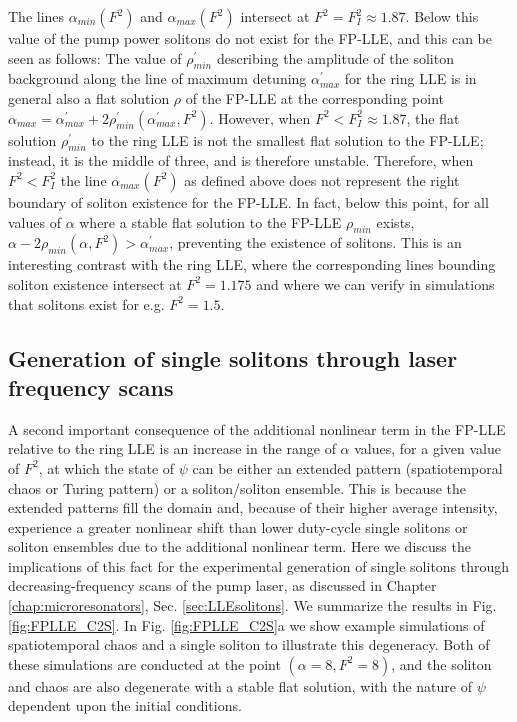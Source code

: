 The lines $\alpha_{min} (F^2)$ and $\alpha_{max} (F^2)$ intersect at $F^2=F_I^2\approx1.87$. Below this value of the pump power solitons do not exist for the FP-LLE, and this can be seen as follows: The value of $\rho_{min}^\prime$ describing the amplitude of the soliton background along the line of maximum detuning $\alpha_{max}^\prime$ for the ring LLE is in general also a flat solution $\rho$ of the FP-LLE at the corresponding point $\alpha_{max}=\alpha_{max}^\prime+2\rho_{min}^\prime (\alpha_{max}^\prime,F^2)$. However, when $F^2<F_I^2\approx1.87$, the flat solution $\rho_{min}^\prime$ to the ring LLE is not the smallest flat solution to the FP-LLE; instead, it is the middle of three, and is therefore unstable. Therefore, when $F^2<F_I^2$ the line $\alpha_{max} (F^2)$ as defined above does not represent the right boundary of soliton existence for the FP-LLE. In fact, below this point, for all values of $\alpha$ where a stable flat solution to the FP-LLE $\rho_{min}$   exists, $\alpha-2\rho_{min} (\alpha,F^2 )>\alpha_{max}^\prime$, preventing the existence of solitons. This is an interesting contrast with the ring LLE, where the corresponding lines bounding soliton existence intersect at $F^2=1.175$ and where we can verify in simulations that solitons exist for e.g. $F^2=1.5$.


\subsection{Generation of single solitons through laser frequency scans}

A second important consequence of the additional nonlinear term in the FP-LLE relative to the ring LLE is an increase in the range of $\alpha$ values, for a given value of $F^2$, at which the state of $\psi$ can be either an extended pattern (spatiotemporal chaos or Turing pattern) or a soliton/soliton ensemble. This is because the extended patterns fill the domain and, because of their higher average intensity, experience a greater nonlinear shift than lower duty-cycle single solitons or soliton ensembles due to the additional nonlinear term. Here we discuss the implications of this fact for the experimental generation of single solitons through decreasing-frequency scans of the pump laser, as discussed in Chapter \ref{chap:microresonators}, Sec. \ref{sec:LLEsolitons}. We summarize the results in Fig. \ref{fig:FPLLE_C2S}.  In Fig. \ref{fig:FPLLE_C2S}a we show example simulations of spatiotemporal chaos and a single soliton to illustrate this degeneracy. Both of these simulations are conducted at the point $(\alpha=8,F^2=8)$, and the soliton and chaos are also degenerate with a stable flat solution, with the nature of $\psi$ dependent upon the initial conditions. 

